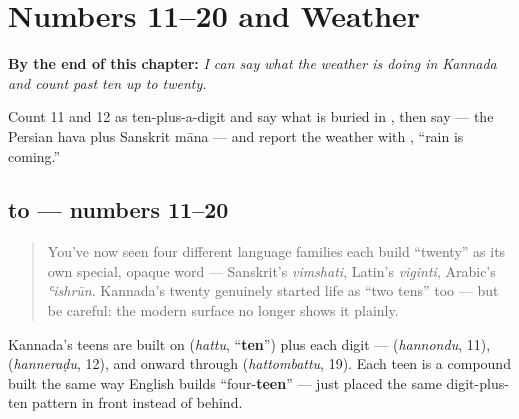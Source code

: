 
\chapter{Numbers 11–20 and Weather}
\label{ch:ka-numbers-and-weather}

\begin{chapteropening}
\textbf{By the end of this chapter:} \emph{I can say what the weather is doing in Kannada and count past ten up to twenty.}

Count 11 and 12 as ten-plus-a-digit and say what is buried in , then say  — the Persian hava plus Sanskrit māna — and report the weather with  , \textquotedblleft{}rain is coming.\textquotedblright{}
\end{chapteropening}

\section[\texorpdfstring{\kn{ಹನ್ನೊಂದು} — \kn{ಇಪ್ಪತ್ತು} (hannondu — ippattu)}{ಹನ್ನೊಂದು — ಇಪ್ಪತ್ತು (hannondu — ippattu)}]{ to  — numbers 11–20}

\label{lesson:KA-C20-hannondu-ippattu}



\begin{quote}
You've now seen four different language families each build \textquotedblleft{}twenty\textquotedblright{} as its own special, opaque word — Sanskrit's \emph{vimshati}, Latin's \emph{viginti}, Arabic's \emph{ʿishrūn}. Kannada's twenty genuinely started life as \textquotedblleft{}two tens\textquotedblright{} too — but be careful: the modern surface no longer shows it plainly.
\end{quote}

\begin{cousinweb}
Kannada's teens are built on \textbf{} (\emph{hattu}, \textquotedblleft{}\textbf{ten}\textquotedblright{}) plus each digit — \textbf{} (\emph{hannondu}, 11), \textbf{} (\emph{hanneraḍu}, 12), and onward through \textbf{} (\emph{hattombattu}, 19). Each teen is a compound built the same way English builds \textquotedblleft{}four-\textbf{teen}\textquotedblright{} — just placed the same digit-plus-ten pattern in front instead of behind.
\end{cousinweb}

